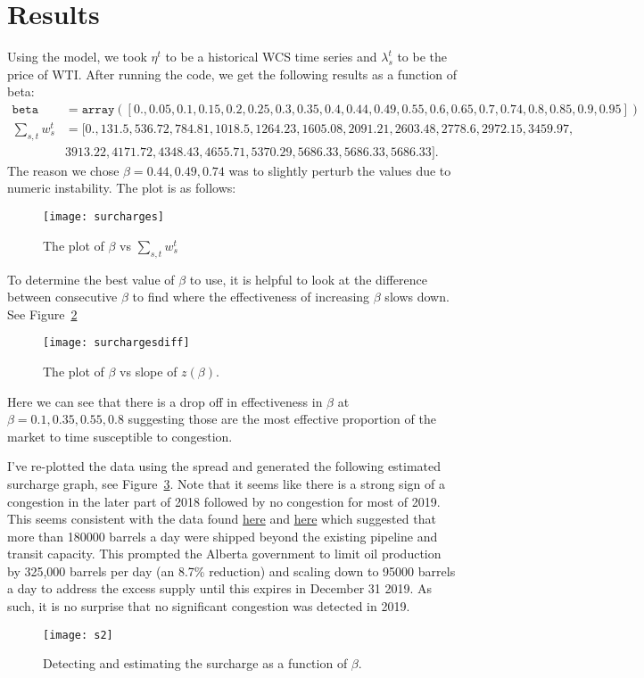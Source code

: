 \documentclass[11pt, letterpaper,nounbold]{article}
\begin{document}
\section{Results}
Using the model, we took $\eta^{t}$ to be a historical WCS time series and $\lambda_{s}^{t}$ to be the price of WTI. After running the code, we get the following results as a function of beta:
\begin{align*}
	\texttt{beta} &= \texttt{array}([0.  , 0.05, 0.1 , 0.15, 0.2 , 0.25, 0.3 , 0.35, 0.4 , 0.44, 0.49,
       0.55, 0.6 , 0.65, 0.7 , 0.74, 0.8 , 0.85, 0.9 , 0.95])\\
       	\sum_{s,t}w_{s}^{t} &=[ 0.,   131.5,   536.72,  784.81, 1018.5,  1264.23, 1605.08, 2091.21, 2603.48, 2778.6,  2972.15, 3459.97, \\
       		&3913.22, 4171.72, 4348.43, 4655.71, 5370.29, 5686.33, 5686.33, 5686.33].
       \end{align*}
The reason we chose $\beta = 0.44, 0.49, 0.74$ was to slightly perturb the values due to numeric instability. The plot is as follows:
	\begin{figure}[h!]
\centering
\texttt{[image: surcharges]}
\caption{The plot of $\beta$ vs $\sum_{s,t} w_{s}^{t}$} \label{surcharge}
\end{figure}

To determine the best value of $\beta$ to use, it is helpful to look at the difference between consecutive $\beta$ to find where the effectiveness of increasing $\beta$ slows down. See Figure~\ref{surchargediff}

	\begin{figure}[h!]
\centering
\texttt{[image: surchargesdiff]}
\caption{The plot of $\beta$ vs slope of $z(\beta)$.} \label{surchargediff}
\end{figure}
Here we can see that there is a drop off in effectiveness in $\beta$ at $\beta = 0.1, 0.35, 0.55, 0.8$ suggesting those are the most effective proportion of the market to time susceptible to congestion.

I've re-plotted the data using the spread and generated the following estimated surcharge graph, see Figure~\ref{s2}. Note that it seems like there is a strong sign of a congestion in the later part of 2018 followed by no congestion for most of 2019. This seems consistent with the data found \href{https://www.alberta.ca/release.cfm?xID=621526E3935AA-08A2-6F45-72145AEBDF115BDF}{here} and \href{https://www.alberta.ca/oil-production-limit.aspx}{here} which suggested that more than 180000 barrels a day were shipped beyond the existing pipeline and transit capacity. This prompted the Alberta government to limit oil production by 325,000 barrels per day (an 8.7\% reduction) and scaling down to 95000 barrels a day to address the excess supply until this expires in December 31 2019. As such, it is no surprise that no significant congestion was detected in 2019.

	\begin{figure}[h!]
\centering
\texttt{[image: s2]}
\caption{Detecting and estimating the surcharge as a function of $\beta$.} \label{s2}
\end{figure}


\end{document}
